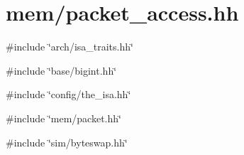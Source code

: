 \hypertarget{packet__access_8hh}{
\section{mem/packet\_\-access.hh}
\label{packet__access_8hh}
}
{\ttfamily \#include \char`\"{}arch/isa\_\-traits.hh\char`\"{}}\par
{\ttfamily \#include \char`\"{}base/bigint.hh\char`\"{}}\par
{\ttfamily \#include \char`\"{}config/the\_\-isa.hh\char`\"{}}\par
{\ttfamily \#include \char`\"{}mem/packet.hh\char`\"{}}\par
{\ttfamily \#include \char`\"{}sim/byteswap.hh\char`\"{}}\par
